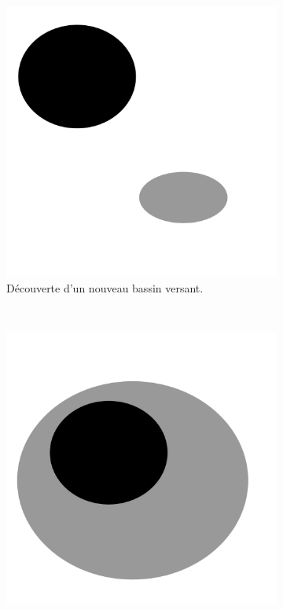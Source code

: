 \begin{figure}[htb]
	\centering
	 \begin{subfigure}[t]{0.3\textwidth}	
			\includegraphics[width=\textwidth]{images/sur-segmentation/immerssionSim1}
		 	\caption{Découverte d'un nouveau bassin versant.}
	\end{subfigure}
	~
	 \begin{subfigure}[t]{0.3\textwidth}	
			\includegraphics[width=\textwidth]{images/sur-segmentation/immerssionSim2}

\end{subfigure}
\end{figure}
